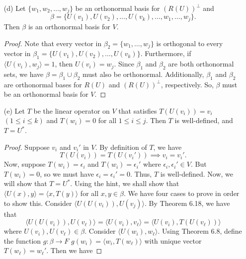 \begin{enumerate}
\begin{proof}
        \end{proof}
    \item[(d)] Let \( \{ {w}_{1}, {w}_{2}, \dots, {w}_{j} \}   \)  be an orthonormal basis for \( (R(U))^{\perp} \) and 
        \[ \beta = \{ U({v}_{1}), U({v}_{2}), \dots, U({v}_{k}), \dots, {w}_{1}, \dots, {w}_{j} \}. \] Then \( \beta  \) is an orthonormal basis for \( V  \).
        \begin{proof}
        Note that every vector in  \( {\beta}_{2} =  \{ {w}_{1}, \dots, {w}_{j} \} \) is orthogonal to every vector in \( {\beta}_{1} = \{ U({v}_{1}), U({v}_{2}), \dots, U({v}_{k}) \}  \). Furthermore, if \( \langle U({v}_{i}) ,  {w}_{j} \rangle = 1  \), then \( U({v}_{i}) = {w}_{j} \). Since \( {\beta}_{1} \) and \( {\beta}_{2} \) are both orthonormal sets, we have \( \beta = {\beta}_{1} \cup {\beta}_{2} \) must also be orthonormal. Additionally, \( {\beta}_{1}  \) and \( {\beta}_{2}  \) are orthonormal bases for \( R(U) \) and \( (R(U))^{\perp} \), respectively. So, \(  \beta   \) must be an orthonormal basis for \( V  \).     
        \end{proof}
    \item[(e)] Let \( T  \) be the linear operator on \( V  \) that satisfies \( T(U({v}_{i})) = {v}_{i} \) \( (1 \leq i \leq k) \) and \( T({w}_{i}) = 0  \) for all \( 1 \leq i \leq j  \). Then \( T  \) is well-defined, and \( T = U^{*} \).
        \begin{proof}
        Suppose \( {v}_{i} \) and \( {v}_{i}' \) in \( V  \). By definition of \( T  \), we have
        \[  T(U({v}_{i})) = T(U({v}_{i}')) \implies {v}_{i} = {v}_{i}'. \]
        Now, suppose \( T({w}_{i}) = {\epsilon}_{i} \) and \( T({w}_{i}) = {\epsilon}_{i}' \) where \( {\epsilon}_{i}, {\epsilon}_{i}' \in V  \). But \( T({w}_{i}) = 0  \), so we must have \( {\epsilon}_{i} = {\epsilon}_{i}' = 0  \). Thus, \( T  \) is well-defined. Now, we will show that \( T = U^{*} \). Using the hint, we shall show that \( \langle U(x) , y \rangle = \langle x  , T(y)  \rangle \) for all \( x,y \in \beta \). We have four cases to prove in order to show this. Consider \( \langle U(U({v}_{i})) , U({v}_{j}) \rangle \). By Theorem 6.18, we have that    
        \[  \langle U(U({v}_{i})) , U({v}_{\ell}) \rangle = \langle U({v}_{i}) , {v}_{\ell} \rangle = \langle U({v}_{i}) ,  T(U({v}_{\ell})) \rangle \]
        where \( U({v}_{i}), U({v}_{\ell}) \in \beta  \). Consider \( \langle U({w}_{i}) , {w}_{\ell} \rangle  \). Using Theorem 6.8, define the function \( g: \beta \to F  \) \( g({w}_{i}) =  \langle {w}_{i} , T({w}_{\ell})  \rangle \) with unique vector \(  T({w}_{\ell}) = {w}_{\ell}' \). Then we have

\end{proof}
\end{enumerate}
